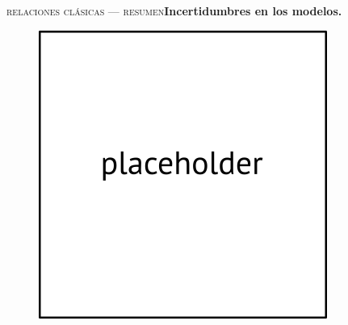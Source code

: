 \documentclass[xcolor=dvipsnames,4pt,hyperref={colorlinks,citecolor=black,linkcolor=black,urlcolor=black}]{beamer}
\begin{document}
\begin{frame}{\textsc{relaciones clásicas --- resumen}}{\textbf{Incertidumbres en los modelos.}}

\begin{figure}
\includegraphics[scale=1]{img/placeholder}
\end{figure}

\end{frame}
\end{document}
